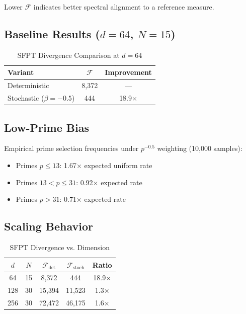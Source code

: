 \documentclass[11pt]{article}
\begin{document}
Lower $\mathcal{F}$ indicates better spectral alignment to a reference measure.

\subsection{Baseline Results ($d=64$, $N=15$)}

\begin{table}[h]
\centering
\caption{SFPT Divergence Comparison at $d=64$}
\begin{tabular}{lcc}
\toprule
Variant & $\mathcal{F}$ & Improvement \\
\midrule
Deterministic & 8,372 & --- \\
Stochastic ($\beta = -0.5$) & 444 & 18.9× \\
\bottomrule
\end{tabular}
\end{table}

\subsection{Low-Prime Bias}

Empirical prime selection frequencies under $p^{-0.5}$ weighting (10,000 samples):
\begin{itemize}
\item Primes $p \leq 13$: 1.67× expected uniform rate
\item Primes $13 < p \leq 31$: 0.92× expected rate
\item Primes $p > 31$: 0.71× expected rate
\end{itemize}

\subsection{Scaling Behavior}

\begin{table}[h]
\centering
\caption{SFPT Divergence vs. Dimension}
\begin{tabular}{ccccc}
\toprule
$d$ & $N$ & $\mathcal{F}_{\text{det}}$ & $\mathcal{F}_{\text{stoch}}$ & Ratio \\
\midrule
64  & 15 & 8,372  & 444    & 18.9× \\
128 & 30 & 15,394 & 11,523 & 1.3× \\
256 & 30 & 72,472 & 46,175 & 1.6× \\
\bottomrule
\end{tabular}
\end{table}
\end{document}
